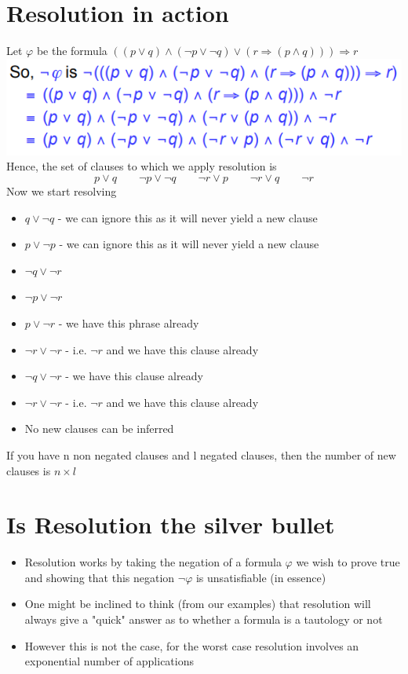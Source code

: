 \documentclass{article}[18pt]
\begin{document}
\section{Resolution in action}
Let $\varphi$ be the formula $((p\lor q)\land (\lnot p\lor \lnot q)\lor (r\Rightarrow (p\land q)))\Rightarrow r$\\
\includegraphics[scale=0.7]{action}\\
Hence, the set of clauses to which we apply resolution is
$$p\lor q \qquad \lnot p\lor \lnot q \qquad \lnot r\lor p \qquad \lnot r\lor q \qquad \lnot r$$
Now we start resolving
\begin{itemize}
	\item \st{$q\lor\lnot q$} - we can ignore this as it will never yield a new clause
	\item \st{$p\lor\lnot p$} - we can ignore this as it will never yield a new clause
	\item $\lnot q \lor \lnot r$
	\item $\lnot p\lor \lnot r$
	\item \st{$p\lor\lnot r$} - we have this phrase already
	\item \st{$\lnot r\lor \lnot r$} - i.e. $\lnot r$ and we have this clause already 
	\item \st{$\lnot q \lor \lnot r$} - we have this clause already
	\item \st{$\lnot r\lor \lnot r$} - i.e. $\lnot r$ and we have this clause already 
	\item No new clauses can be inferred 
\end{itemize}
If you have n non negated clauses and l negated clauses, then the number of new clauses is $n\times l$
\section{Is Resolution the silver bullet}
\begin{itemize}
	\item Resolution works by taking the negation of a formula $\varphi$ we wish to prove true and showing that this negation $\lnot \varphi$ is unsatisfiable (in essence)
	\item One might be inclined to think (from our examples) that resolution will always give a "quick" answer as to whether a formula is a tautology or not
	\item However this is not the case, for the worst case resolution involves an exponential number of applications
\end{itemize}
\end{document}

